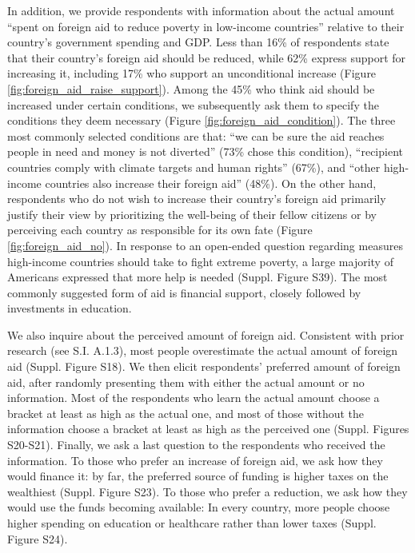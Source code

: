 In addition, we provide respondents with information about the actual amount ``spent on foreign aid to reduce poverty in low-income countries'' relative to their country's government spending and GDP. Less than 16\% of respondents state that their country's foreign aid should be reduced, while 62\% express support for increasing it, including 17\% who support an unconditional increase (Figure \ref{fig:foreign_aid_raise_support}). Among the 45\% who think aid should be increased under certain conditions, we subsequently ask them to specify the conditions they deem necessary (Figure \ref{fig:foreign_aid_condition}). The three most commonly selected conditions are that: ``we can be sure the aid reaches people in need and money is not diverted'' (73\% chose this condition), ``recipient countries comply with climate targets and human rights'' (67\%), and ``other high-income countries also increase their foreign aid'' (48\%). %
On the other hand, respondents who do not wish to increase their country's foreign aid primarily justify their view by prioritizing the well-being of their fellow citizens or by perceiving each country as responsible for its own fate (Figure \ref{fig:foreign_aid_no}). In response to an open-ended question regarding measures high-income countries should take to fight extreme poverty, a large majority of Americans expressed that more help is needed (Suppl. Figure S39). %
The most commonly suggested form of aid is financial support, closely followed by investments in education. 

We also inquire about the perceived amount of foreign aid. Consistent with prior research (see S.I. A.1.3), %
most people overestimate the actual amount of foreign aid (Suppl. Figure S18). %
We then elicit respondents' preferred amount of foreign aid, after randomly presenting them with either the actual amount or no information. Most of the respondents who learn the actual amount choose a bracket at least as high as the actual one, and most of those without the information choose a bracket at least as high as the perceived one (Suppl. Figures S20-S21). %
Finally, we ask a last question to the respondents who received the information. To those who prefer an increase of foreign aid, we ask how they would finance it: by far, the preferred source of funding is higher taxes on the wealthiest (Suppl. Figure S23). %
To those who prefer a reduction, we ask how they would use the funds becoming available: %
In every country, more people choose higher spending on education or healthcare rather than lower taxes (Suppl. Figure S24). %


